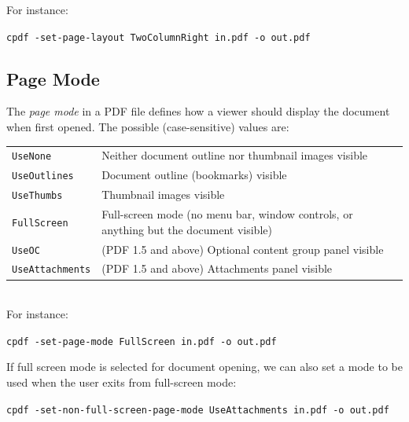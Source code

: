 \documentclass{book}
\begin{document}
  \noindent For instance:
  \begin{framed}
    \noindent\small\verb!cpdf -set-page-layout TwoColumnRight in.pdf -o out.pdf!
  \end{framed}
  


  \subsection{Page Mode}
  The \textit{page mode} in a PDF file defines how a viewer should display the
document when first opened. The possible (case-sensitive) values are:

\vspace{2mm}
  {\small\begin{tabular}{ll}
    \texttt{UseNone} & \vspace{2mm} \parbox{8cm}{Neither document outline nor thumbnail images visible} \\
    \texttt{UseOutlines} & \vspace{2mm} \parbox{8cm}{Document outline (bookmarks) visible} \\
    \texttt{UseThumbs} & \vspace{2mm} \parbox{8cm}{Thumbnail images visible} \\
    \texttt{FullScreen} & \vspace{2mm} \parbox{8cm}{Full-screen mode (no menu bar, window controls, or anything but the document visible)} \\
    \texttt{UseOC} & \vspace{2mm} \parbox{8cm}{(PDF 1.5 and above) Optional content group panel visible} \\
    \texttt{UseAttachments} & \vspace{2mm} \parbox{8cm}{(PDF 1.5 and above) Attachments panel visible}
  \end{tabular}}\\

  \noindent For instance:
  \begin{framed}
    \noindent\small\verb!cpdf -set-page-mode FullScreen in.pdf -o out.pdf!
  \end{framed}
  
  \noindent If full screen mode is selected for document opening, we can also set a mode to be used when the user exits from full-screen mode:
  \begin{framed}
    \noindent\small\verb!cpdf -set-non-full-screen-page-mode UseAttachments in.pdf -o out.pdf!
  \end{framed}
\end{document}
